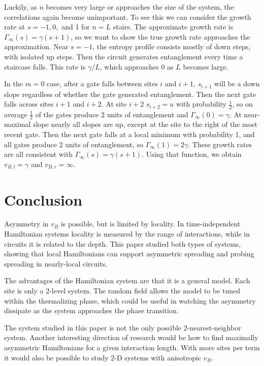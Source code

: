 \documentclass[aps,prx,reprint,superscriptaddress, longbibliography]{revtex4-1}
\newcommand{\half}{\frac{1}{2}}
\begin{document}
Luckily, as $n$ becomes very large or approaches the size of the system, the correlations again become unimportant. To see this we can consider the growth rate at $s = -1, 0,$ and 1 for $n=L$ stairs. The approximate growth rate is $\Gamma_\infty(s)=\gamma(s+1)$, so we want to show the true growth rate approaches the approximation. Near $s=-1$, the entropy profile consists mostly of down steps, with isolated up steps. Then the circuit generates entanglement every time a staircase falls. This rate is $\gamma/L$, which approaches 0 as $L$ becomes large.

In the $m = 0$ case, after a gate falls between sites $i$ and $i + 1$, $s_{i+1}$ will be a down slope regardless of whether the gate generated entanglement. Then the next gate falls across sites $i + 1$ and $i+2$. At site $i+2$ $s_{i+2} = u$ with probability $\half$, so on average $\half$ of the gates produce 2 units of entanglement and $\Gamma_\infty(0)=\gamma$. At near-maximal slope nearly all slopes are up, except at the site to the right of the most recent gate. Then the next gate falls at a local minimum with probability 1, and all gates produce 2 units of entanglement, so $\Gamma_\infty(1)=2\gamma$. These growth rates are all consistent with $\Gamma_\infty(s)=\gamma(s+1)$. Using that function, we obtain $v_{B,l}=\gamma$ and $v_{B,r}=\infty$.

\section{Conclusion}

Asymmetry in $v_B$ is possible, but is limited by locality. In time-independent Hamiltonian systems locality is measured by the range of interactions, while in circuits it is related to the depth. This paper studied both types of systems, showing that local Hamiltonians can support asymmetric spreading and probing spreading in nearly-local circuits. 

The advantages of the Hamiltonian system are that it is a general model. Each site is only a 2-level system. The random field allows the model to be tuned within the thermalizing phase, which could be useful in watching the asymmetry dissipate as the system approaches the phase transition. 

The system studied in this paper is not the only possible 2-nearest-neighbor system. Another interesting direction of research would be how to find maximally asymmetric Hamiltonians for a given interaction length. With more sites per term it would also be possible to study 2-D systems with anisotropic $v_B$.
\end{document}
